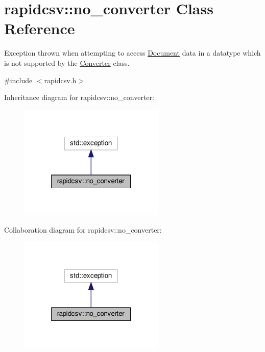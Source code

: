 \hypertarget{classrapidcsv_1_1no__converter}{}\section{rapidcsv\+:\+:no\+\_\+converter Class Reference}
\label{classrapidcsv_1_1no__converter}


Exception thrown when attempting to access \hyperlink{classrapidcsv_1_1Document}{Document} data in a datatype which is not supported by the \hyperlink{classrapidcsv_1_1Converter}{Converter} class.  




{\ttfamily \#include $<$rapidcsv.\+h$>$}



Inheritance diagram for rapidcsv\+:\+:no\+\_\+converter\+:
\nopagebreak
\begin{figure}[H]
\begin{center}
\leavevmode
\includegraphics[width=196pt]{classrapidcsv_1_1no__converter__inherit__graph}
\end{center}
\end{figure}


Collaboration diagram for rapidcsv\+:\+:no\+\_\+converter\+:
\nopagebreak
\begin{figure}[H]
\begin{center}
\leavevmode
\includegraphics[width=196pt]{classrapidcsv_1_1no__converter__coll__graph}
\end{center}
\end{figure}


